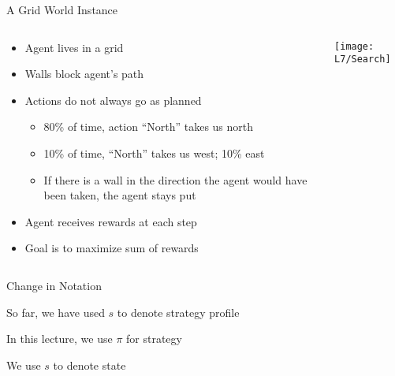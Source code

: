 \documentclass[11pt,aspectratio=169]{beamer}
\begin{document}
  
  \begin{frame}{A Grid World Instance}
   \begin{columns}
    \begin{column}{0.6\textwidth}
     \begin{itemize}
     \setlength{\itemsep}{0.5em}
      \item Agent lives in a grid
      \item Walls block agent's path
      \item Actions do not always go as planned
      \begin{itemize}
       \item 80\% of time, action ``North'' takes us north
       \item 10\% of time, ``North'' takes us west; 10\% east
       \item If there is a wall in the direction the agent would have been taken, the agent stays put
      \end{itemize}
      \item Agent receives rewards at each step
      \item Goal is to maximize sum of rewards
     \end{itemize}
    \end{column}
    \begin{column}{0.4\textwidth}
     \begin{center}
      \texttt{[image: L7/Search]}
     \end{center}
    \end{column}
   \end{columns}
  \end{frame}
  
  
  \begin{frame}{Change in Notation}
   \begin{itemizes}[2em]
    \item So far, we have used \alert{$s$} to denote \alert{strategy profile}
    \item In this lecture, we use \alert{$\pi$} for strategy
    \item We use \alert{$s$} to denote \alert{state}
   \end{itemizes}
  \end{frame}
  
\end{document}
